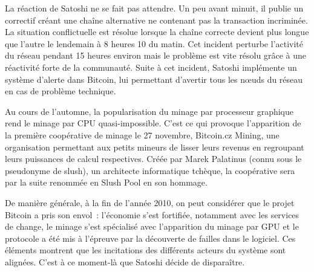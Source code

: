La réaction de Satoshi ne se fait pas attendre. Un peu avant minuit, il publie un correctif créant une chaîne alternative ne contenant pas la transaction incriminée. La situation conflictuelle est résolue lorsque la chaîne correcte devient plus longue que l'autre le lendemain à 8 heures 10 du matin. Cet incident perturbe l'activité du réseau pendant 15 heures environ mais le problème est vite résolu grâce à une réactivité forte de la communauté. Suite à cet incident, Satoshi implémente un système d'alerte dans Bitcoin, lui permettant d'avertir tous les nœuds du réseau en cas de problème technique.

Au cours de l'automne, la popularisation du minage par processeur graphique rend le minage par CPU quasi-impossible. C'est ce qui provoque l'apparition de la première coopérative de minage le 27 novembre, Bitcoin.cz Mining, une organisation permettant aux petits mineurs de lisser leurs revenus en regroupant leurs puissances de calcul respectives. Créée par Marek Palatinus (connu sous le pseudonyme de slush), un architecte informatique tchèque, la coopérative sera par la suite renommée en Slush Pool en son hommage.

De manière générale, à la fin de l'année 2010, on peut considérer que le projet Bitcoin a pris son envol~: l'économie s'est fortifiée, notamment avec les services de change, le minage s'est spécialisé avec l'apparition du minage par GPU et le protocole a été mis à l'épreuve par la découverte de failles dans le logiciel. Ces éléments montrent que les incitations des différents acteurs du système sont alignées. C'est à ce moment-là que Satoshi décide de disparaître.

